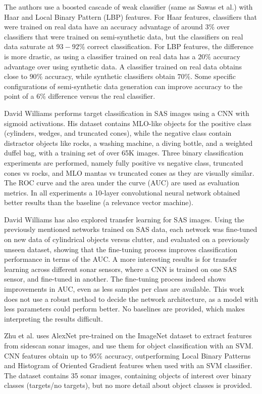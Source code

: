 The authors use a boosted cascade of weak classifier (same as Sawas et al.) with Haar and Local Binary Pattern (LBP) features. For Haar features, classifiers that were trained on real data have an accuracy advantage of around $3 \%$ over classifiers that were trained on semi-synthetic data, but the classifiers on real data saturate at $93-92 \%$ correct classification.
For LBP features, the difference is more drastic, as using a classifier trained on real data has a $20 \%$ accuracy advantage over using synthetic data. A classifier trained on real data obtains close to $90 \%$ accuracy, while synthetic classifiers obtain $70 \%$. Some specific configurations of semi-synthetic data generation can improve accuracy to the point of a $6 \%$ difference versus the real classifier.

David Williams \cite{williams2016underwater} performs target classification in SAS images using a CNN with sigmoid activations. His dataset contains MLO-like objects for the positive class (cylinders, wedges, and truncated cones), while the negative class contain distractor objects like rocks, a washing machine, a diving bottle, and a weighted duffel bag, with a training set of over 65K images. Three binary classification experiments are performed, namely fully positive vs negative class, truncated cones vs rocks, and MLO mantas vs truncated cones as they are visually similar. The ROC curve and the area under the curve (AUC) are used as  evaluation metrics. In all experiments a 10-layer convolutional neural network obtained better results than the baseline (a relevance vector machine).

David Williams \cite[-1em]{williams2018underwater} has also explored transfer learning for SAS images. Using the previously mentioned networks trained on SAS data, each network was fine-tuned on new data of cylindrical objects versus clutter, and evaluated on a previously unseen dataset, showing that the fine-tuning process improves classification performance in terms of the AUC. A more interesting results is for transfer learning across different sonar sensors, where a CNN is trained on one SAS sensor, and fine-tuned in another. The fine-tuning process indeed shows improvements in AUC, even as less samples per class are available.
This work does not use a robust method to decide the network architecture, as a model with less parameters could perform better. No baselines are provided, which makes interpreting the results difficult.

Zhu et al. \cite{zhu2017deeplearning} uses AlexNet pre-trained on the ImageNet dataset to extract features from sidescan sonar images, and use them for object classification with an SVM. CNN features obtain up to $95 \%$ accuracy, outperforming Local Binary Patterns and Histogram of Oriented Gradient features when used with an SVM classifier. The dataset contains 35 sonar images, containing objects of interest over binary classes (targets/no targets), but no more detail about object classes is provided.

